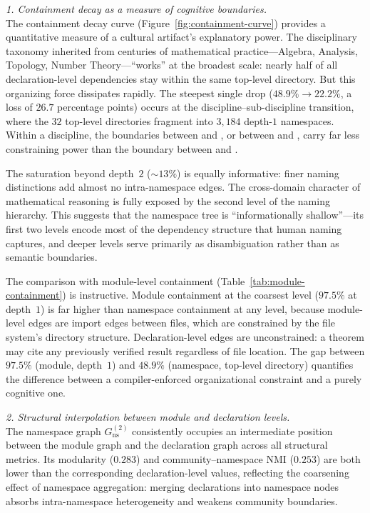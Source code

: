 \noindent \textit{1. Containment decay as a measure of cognitive boundaries.} \\
The containment decay curve (Figure~\ref{fig:containment-curve}) provides a quantitative measure of a cultural artifact's explanatory power. The disciplinary taxonomy inherited from centuries of mathematical practice---Algebra, Analysis, Topology, Number Theory---``works'' at the broadest scale: nearly half of all declaration-level dependencies stay within the same top-level directory. But this organizing force dissipates rapidly. The steepest single drop ($48.9\% \to 22.2\%$, a loss of $26.7$ percentage points) occurs at the discipline--sub-discipline transition, where the $32$ top-level directories fragment into $3{,}184$ depth-$1$ namespaces. Within a discipline, the boundaries between  and , or between  and , carry far less constraining power than the boundary between  and .

The saturation beyond depth~$2$ (${\sim}13\%$) is equally informative: finer naming distinctions add almost no intra-namespace edges. The cross-domain character of mathematical reasoning is fully exposed by the second level of the naming hierarchy. This suggests that the namespace tree is ``informationally shallow''---its first two levels encode most of the dependency structure that human naming captures, and deeper levels serve primarily as disambiguation rather than as semantic boundaries.

The comparison with module-level containment (Table~\ref{tab:module-containment}) is instructive. Module containment at the coarsest level ($97.5\%$ at depth~$1$) is far higher than namespace containment at any level, because module-level edges are import edges between files, which are constrained by the file system's directory structure. Declaration-level edges are unconstrained: a theorem may cite any previously verified result regardless of file location. The gap between $97.5\%$ (module, depth~$1$) and $48.9\%$ (namespace, top-level directory) quantifies the difference between a compiler-enforced organizational constraint and a purely cognitive one.

\medskip
\noindent \textit{2. Structural interpolation between module and declaration levels.} \\
The namespace graph $G_{\mathrm{ns}}^{(2)}$ consistently occupies an intermediate position between the module graph and the declaration graph across all structural metrics. Its modularity ($0.283$) and community--namespace NMI ($0.253$) are both lower than the corresponding declaration-level values, reflecting the coarsening effect of namespace aggregation: merging declarations into namespace nodes absorbs intra-namespace heterogeneity and weakens community boundaries.

